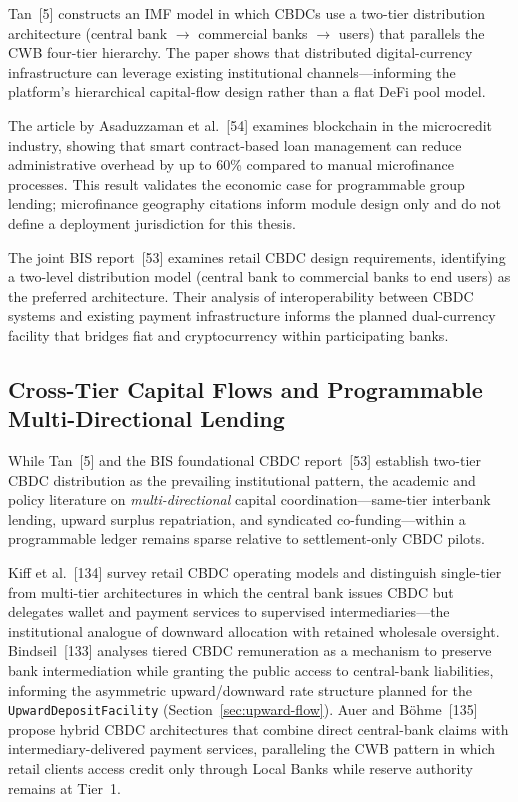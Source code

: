 \documentclass[12pt,a4paper]{report}
\begin{document}
Tan~[5] constructs an IMF model in which CBDCs use a two-tier distribution architecture (central bank $\to$ commercial banks $\to$ users) that parallels the CWB four-tier hierarchy. The paper shows that distributed digital-currency infrastructure can leverage existing institutional channels---informing the platform's hierarchical capital-flow design rather than a flat DeFi pool model.

The article by Asaduzzaman et al.~[54] examines blockchain in the microcredit industry, showing that smart contract-based loan management can reduce administrative overhead by up to 60\% compared to manual microfinance processes. This result validates the economic case for programmable group lending; microfinance geography citations inform module design only and do not define a deployment jurisdiction for this thesis.

The joint BIS report~[53] examines retail CBDC design requirements, identifying a two-level distribution model (central bank to commercial banks to end users) as the preferred architecture. Their analysis of interoperability between CBDC systems and existing payment infrastructure informs the planned dual-currency facility that bridges fiat and cryptocurrency within participating banks.

\subsection{Cross-Tier Capital Flows and Programmable Multi-Directional Lending}
\label{sec:lit-cross-tier}

While Tan~[5] and the BIS foundational CBDC report~[53] establish two-tier CBDC distribution as the prevailing institutional pattern, the academic and policy literature on \emph{multi-directional} capital coordination---same-tier interbank lending, upward surplus repatriation, and syndicated co-funding---within a programmable ledger remains sparse relative to settlement-only CBDC pilots.

Kiff et al.~[134] survey retail CBDC operating models and distinguish single-tier from multi-tier architectures in which the central bank issues CBDC but delegates wallet and payment services to supervised intermediaries---the institutional analogue of downward allocation with retained wholesale oversight. Bindseil~[133] analyses tiered CBDC remuneration as a mechanism to preserve bank intermediation while granting the public access to central-bank liabilities, informing the asymmetric upward/downward rate structure planned for the \texttt{UpwardDepositFacility} (Section~\ref{sec:upward-flow}). Auer and B\"{o}hme~[135] propose hybrid CBDC architectures that combine direct central-bank claims with intermediary-delivered payment services, paralleling the CWB pattern in which retail clients access credit only through Local Banks while reserve authority remains at Tier~1.
\end{document}
